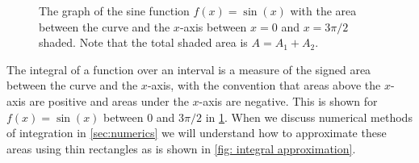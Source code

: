 \begin{figure}[htbp]
    \centering
{}
    \caption{The graph of the sine function  $f(x)=\sin(x)$ with the area between the curve and the $x$-axis between $x=0$ and $x=3\pi/2$ shaded. Note that the total shaded area is $A=A_{1}+A_{2}$.}
        \label{fig: sine function graph shaded}
\end{figure}


The integral of a function over an interval is a measure of the signed area between the curve and the $x$-axis, with the convention that areas above the $x$-axis are positive and areas under the $x$-axis are negative.  This is shown for $f(x)=\sin(x)$ between $0$ and $3\pi/2$ in \cref{fig: sine function graph shaded}. When we discuss numerical methods of integration in \cref{sec:numerics} we will understand how to approximate these areas using thin rectangles as is shown in \cref{fig: integral approximation}. \\

